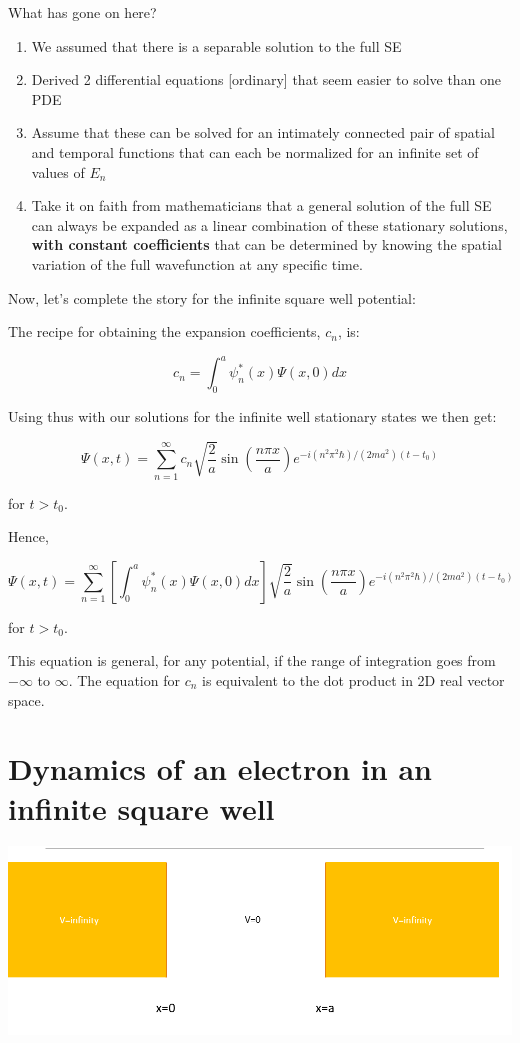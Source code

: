 \documentclass{article}
\begin{document}
What has gone on here?

\begin{enumerate}
    \item We assumed that there is a separable solution to the full SE
    \item Derived 2 differential equations [ordinary] that seem easier to solve than one PDE
    \item Assume that these can be solved for an intimately connected pair of spatial and temporal functions that can each be normalized for an infinite set of values of $E_n$
    \item Take it on faith from mathematicians that a general solution of the full SE can always be expanded as a linear combination of these stationary solutions, \textbf{with constant coefficients} that can be determined by knowing the spatial variation of the full wavefunction at any specific time.
\end{enumerate}

Now, let's complete the story for the infinite square well potential:

The recipe for obtaining the expansion coefficients, $c_n$, is:

$$c_n = \int_0^a \psi_n^* (x) \Psi(x,0) dx$$

Using thus with our solutions for the infinite well stationary states we then get:

$$\Psi(x,t) = \sum_{n=1}^\infty c_n \sqrt{\frac{2}{a}} \sin \left( \frac{n \pi x}{a} \right) e^{-i (n^2 \pi^2 \hbar)/(2ma^2)(t - t_0)}$$

for $t > t_0$. 

Hence, 

$$\Psi(x,t) = \sum_{n=1}^\infty \left[  \int_0^a \psi_n^* (x) \Psi(x,0) dx \right] \sqrt{\frac{2}{a}} \sin \left( \frac{n \pi x}{a} \right) e^{-i (n^2 \pi^2 \hbar)/(2ma^2)(t - t_0)}$$

for $t > t_0$. 

This equation is general, for any potential, if the range of integration goes from $-\infty$ to $\infty$. The equation for $c_n$ is equivalent to the dot product in 2D real vector space. 

\section{Dynamics of an electron in an infinite square well}

\includegraphics[width = \textwidth]{Lecture05/4.png}
\end{document}
